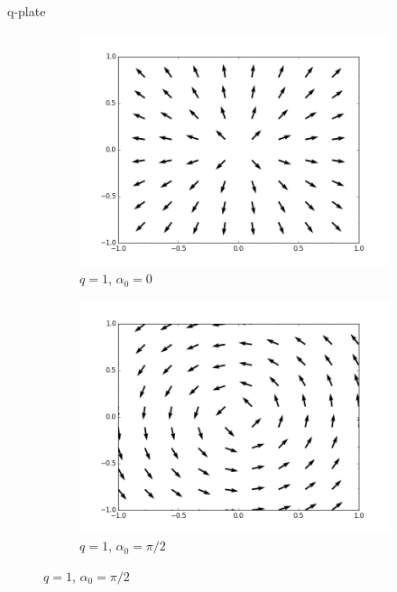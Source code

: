 \documentclass[12pt, dvipsnames]{beamer}
\numberwithin{equation}{section}
\begin{document}
\begin{frame}[t]{q-plate}
	\begin{figure}[H]
		\begin{subfigure}[H]{0.35\textwidth}
			\centering
			\includegraphics[width=\textwidth]{qplate(1).png}
			\caption{$q=1$, $\alpha_0=0$}
			\label{fig:q1}
		\end{subfigure}
		\hfil
		\begin{subfigure}[H]{0.35\textwidth}
			\centering
			\includegraphics[width=\textwidth]{qplate(1,r).png}
			\caption{$q=1$, $\alpha_0=\pi/2$}
			\label{fig:q1r}
		\end{subfigure}
	\end{figure}
\end{frame}
\end{document}

